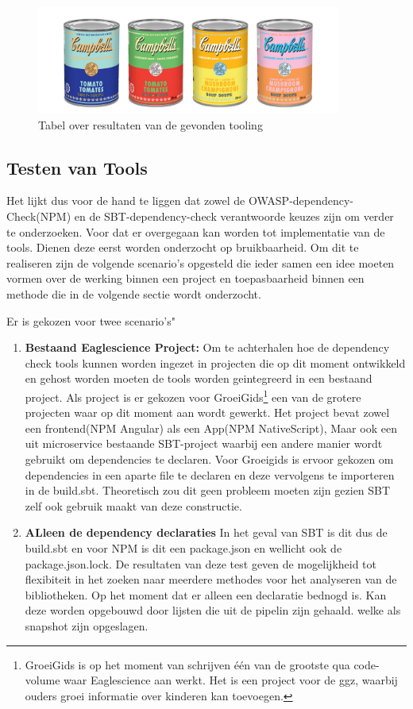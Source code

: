 \begin{figure}
    \centering
    \includegraphics[width=10cm]{gfx/soupcans}
    \caption{Tabel over resultaten van de gevonden tooling}
    \label{fig:resultatenTooling}
\end{figure}

\subsection{Testen van Tools}
Het lijkt dus voor de hand te liggen dat zowel de OWASP-dependency-Check(NPM) en de SBT-dependency-check verantwoorde keuzes zijn om verder te onderzoeken. Voor dat er overgegaan kan worden tot implementatie van de tools. Dienen deze eerst worden onderzocht op bruikbaarheid. Om dit te realiseren zijn de volgende scenario's opgesteld die ieder samen een idee moeten vormen over de werking binnen een project en toepasbaarheid binnen een methode die in de volgende sectie wordt onderzocht.

Er is gekozen voor twee scenario's"
\begin{enumerate}
    \item \textbf{Bestaand Eaglescience Project: }Om te achterhalen hoe de dependency check tools kunnen worden ingezet in projecten die op dit moment ontwikkeld en gehost worden moeten de tools worden geintegreerd in een bestaand project. Als project is er gekozen voor GroeiGids\footnote{GroeiGids is op het moment van schrijven één van de grootste qua code-volume waar Eaglescience aan werkt. Het is een project voor de ggz, waarbij ouders groei informatie over kinderen kan toevoegen.} een van de grotere projecten waar op dit moment aan wordt gewerkt. Het project bevat zowel een frontend(NPM Angular) als een App(NPM NativeScript), Maar ook een uit microservice bestaande SBT-project waarbij een andere manier wordt gebruikt om dependencies te declaren. Voor Groeigids is ervoor gekozen om dependencies in een aparte file te declaren en deze vervolgens te importeren in de build.sbt. Theoretisch zou dit geen probleem moeten zijn gezien SBT zelf ook gebruik maakt van deze constructie.
    \item \textbf{ALleen de dependency declaraties} In het geval van SBT is dit dus de build.sbt en voor NPM is dit een package.json en wellicht ook de package.json.lock. De resultaten van deze test geven de mogelijkheid tot flexibiteit in het zoeken naar meerdere methodes voor het analyseren van de bibliotheken. Op het moment dat er alleen een declaratie bednogd is. Kan deze worden opgebouwd door lijsten die uit de pipelin zijn gehaald. welke als snapshot zijn opgeslagen.
\end{enumerate}

